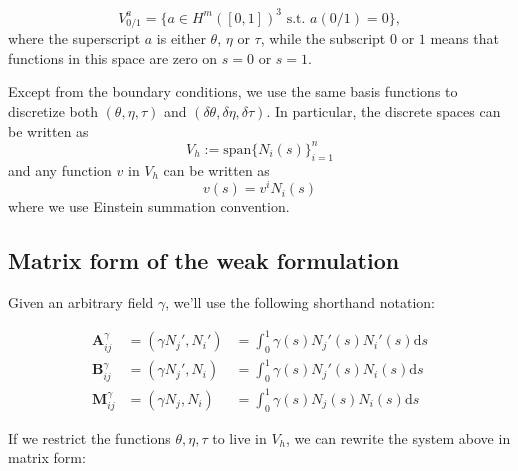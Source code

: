 \documentclass[12pt]{article}
\renewcommand{\d}{\mathrm{d}}
\newcommand{\vv}[1]{\boldsymbol{#1}}
\begin{document}
\begin{equation}
  \label{eq:1}
    V^a_{0/1}  = \{ a \in H^m([0,1])^3 \text{ s.t. } a(0/1) = 0\},
\end{equation}
%
where the superscript $a$ is either $\theta$, $\eta$ or $\tau$, while
the subscript $0$ or $1$ means that functions in this space are zero
on $s=0$ or $s=1$.

Except from the boundary conditions, we use the same basis functions
to discretize both $(\theta, \eta, \tau)$ and $(\delta\theta, \delta
\eta, \delta \tau)$. In particular, the discrete spaces can be written
as 
\begin{equation}
  \label{eq:3}
  V_h := \text{span} \{ N_i(s) \}_{i=1}^n
\end{equation}
and any function $v$ in $V_h$ can be written as
$$
v(s)  = v^i N_i(s)
$$
where we use Einstein summation convention.


\subsection{Matrix form of the weak
formulation}\label{matrix-form-of-the-weak-formulation}

Given an arbitrary field \(\gamma\),
we'll use the following shorthand notation:

\begin{equation}
  \label{eq:2}
  \begin{aligned}
    \vv A^\gamma_{ij} & = (\gamma N_j', N_i') &  = \int_0^1 \gamma(s) N_j'(s)
    N_i'(s) \d s \\
    \vv B^\gamma_{ij} & = (\gamma N_j', N_i) & = \int_0^1 \gamma(s) N_j'(s)
    N_i(s) \d s \\
    \vv M^\gamma_{ij} & = (\gamma N_j, N_i) & = \int_0^1 \gamma(s) N_j(s)
    N_i(s) \d s 
  \end{aligned}
\end{equation}

If we restrict the functions $\theta, \eta, \tau$ to live in $V_h$, we
can rewrite the system above in matrix form:
\end{document}
